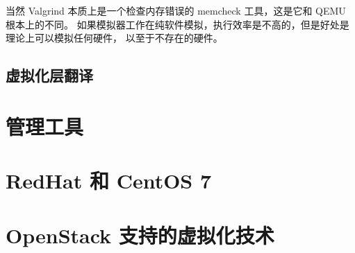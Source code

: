 当然 Valgrind 本质上是一个检查内存错误的 memcheck 工具，这是它和 QEMU 根本上的不同。
如果模拟器工作在纯软件模拟，执行效率是不高的，但是好处是理论上可以模拟任何硬件，
以至于不存在的硬件。

\subsection{虚拟化层翻译}

\section{管理工具}

\section{RedHat 和 CentOS 7}

\section{OpenStack 支持的虚拟化技术}
